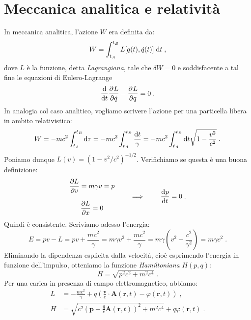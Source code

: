 \section{Meccanica analitica e relatività}
In meccanica analitica, l'azione $W$ era definita da:
\begin{equation}
 W=\int_{t_A}^{t_B} L[q(t),\dot{q}(t)]\;\mathrm{d}{t}\;,
\end{equation}
dove $L$ è la funzione, detta \textit{Lagrangiana}, tale che $\delta W=0$ e soddisfacente a tal fine le equazioni di Eulero-Lagrange
\begin{equation}
\frac{\mathrm{d}}{\mathrm{d}{t}}\frac{\partial^{}L}{\partial \dot{q}^{}}-\frac{\partial^{}L}{\partial q^{}}=0\;.
\end{equation}
In analogia col caso analitico, vogliamo scrivere l'azione per una particella libera in ambito relativistico:
\begin{equation}
W=-mc^2\int_{t_A}^{t_B}\mathrm{d}{\tau}=-mc^2\int_{t_A}^{t_B}\frac{\mathrm{d}{t}}{\gamma}=-mc^2\int_{t_A}^{t_B}\mathrm{d}{t}\sqrt{1-\frac{v^2}{c^2}}\;.
\end{equation}
Poniamo dunque $L(v)=(1-v^2/c^2)^{-1/2}$. Verifichiamo se questa è una buona definizione:
\begin{equation}
\begin{matrix}
\dfrac{\partial L}{\partial v}=m\gamma v =p \\
\\
\dfrac{\partial L}{\partial x}=0
\end{matrix}\qquad \implies \qquad \frac{\mathrm{d}^{}p}{\mathrm{d}t^{}}=0\;.
\end{equation}
Quindi è consistente. Scriviamo adesso l'energia:
\begin{equation}
E=pv-L=pv+\frac{mc^2}{\gamma}=m\gamma v^2+\frac{mc^2}{\gamma}=m\gamma\left(v^2+\frac{c^2}{\gamma^2}\right)=m\gamma c^2\;.
\end{equation}
Eliminando la dipendenza esplicita dalla velocità, cioè esprimendo l'energia in funzione dell'impulso, otteniamo la funzione 
\textit{Hamiltoniana} $H(p,q)$:
\begin{equation}
H=\sqrt{p^2c^2+m^2c^4}\;.
\end{equation}
Per una carica in presenza di campo elettromagnetico, abbiamo:
\begin{align}
L &= -\frac{mc^2}{\gamma}+q\left(\frac{\mathbf{v}}{c}\cdot \mathbf{A}(\mathbf{r},t)-\varphi(\mathbf{r},t)\right)\;, \\
H &= \sqrt{c^2\left(\mathbf{p}-\frac{q}{c}\mathbf{A}(\mathbf{r},t)\right)^2+m^2c^4}+q\varphi(\mathbf{r},t)\;.
\end{align}
